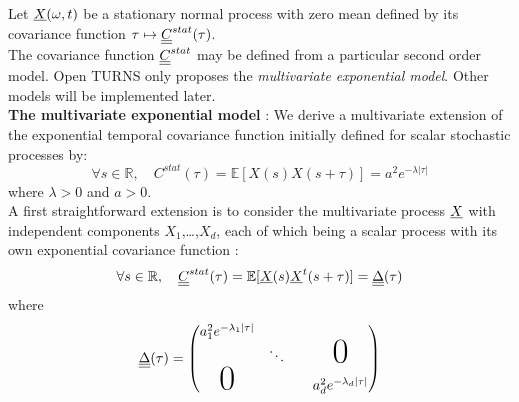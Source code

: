 \renewcommand{\filename}{docUC_StocProc_TemporalNormalProcess_Creation.tex}
\renewcommand{\filetitle}{UC : Creation of a  stationary  normal process from its covariance function}

\HeaderIIILevel

\label{TemporalNormalProcessCreation}


Let ${\underline{X}}(\omega,t)$ be a stationary normal process with zero mean defined  by  its covariance function  $\tau \mapsto {\underline{\underline{C}}}^{stat}(\tau)$.\\

The covariance function ${\underline{\underline{C}}}^{stat}$ may be defined from a particular second order model. Open TURNS only proposes the \emph{multivariate exponential model}. Other models will be implemented later. \\

{\bf The multivariate exponential model} : We derive a multivariate extension of the exponential temporal covariance function initially defined for scalar stochastic processes by:
\begin{equation}
\label{scalarExponential}
\forall s\in\mathbb{R},\quad C^{stat}(\tau)=\mathbb{E}[X(s)X(s+\tau)]=a^2e^{-\lambda|\tau|}
\end{equation}
where $\lambda>0$ and $a>0$.\\

A first straightforward extension is to consider the multivariate process ${\underline{X}}$ with independent components $X_1$,\dots,$X_d$, each of which being a scalar process with its own exponential covariance function :
\begin{equation}
\label{simpleMultivariateExponential1}
\forall s\in\mathbb{R},\quad {\underline{\underline{C}}}^{stat}(\tau)=\mathbb{E}[{\underline{X}}(s){\underline{X}}^t(s+\tau)]={\underline{\underline{\Delta}}}(\tau)
\end{equation}
where
\begin{equation}
\label{simpleMultivariateExponential2}
\mat{\Delta}(\tau)=
\begin{pmatrix}
  a_1^2e^{-\lambda_1|\tau|} & & & \\
                       &\ddots & & \text{\Huge{0}}\\
  \text{\Huge{0}}      & & & a_d^2e^{-\lambda_d|\tau|}
\end{pmatrix}
\end{equation}\\

